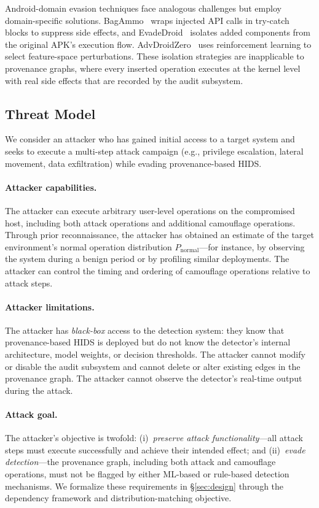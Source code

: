 Android-domain evasion techniques face analogous challenges but employ domain-specific solutions.
BagAmmo~\cite{bagammo} wraps injected API calls in try-catch blocks to suppress side effects, and EvadeDroid~\cite{evadedroid} isolates added components from the original APK's execution flow.
AdvDroidZero~\cite{advdroiedzero} uses reinforcement learning to select feature-space perturbations.
These isolation strategies are inapplicable to provenance graphs, where every inserted operation executes at the kernel level with real side effects that are recorded by the audit subsystem.

\subsection{Threat Model}
\label{sec:bg-threat}

We consider an attacker who has gained initial access to a target system and seeks to execute a multi-step attack campaign (e.g., privilege escalation, lateral movement, data exfiltration) while evading provenance-based HIDS.

\paragraph{Attacker capabilities.}
The attacker can execute arbitrary user-level operations on the compromised host, including both attack operations and additional camouflage operations.
Through prior reconnaissance, the attacker has obtained an estimate of the target environment's normal operation distribution $P_{\text{normal}}$---for instance, by observing the system during a benign period or by profiling similar deployments.
The attacker can control the timing and ordering of camouflage operations relative to attack steps.

\paragraph{Attacker limitations.}
The attacker has \emph{black-box} access to the detection system: they know that provenance-based HIDS is deployed but do not know the detector's internal architecture, model weights, or decision thresholds.
The attacker cannot modify or disable the audit subsystem and cannot delete or alter existing edges in the provenance graph.
The attacker cannot observe the detector's real-time output during the attack.

\paragraph{Attack goal.}
The attacker's objective is twofold: (i)~\emph{preserve attack functionality}---all attack steps must execute successfully and achieve their intended effect; and (ii)~\emph{evade detection}---the provenance graph, including both attack and camouflage operations, must not be flagged by either ML-based or rule-based detection mechanisms.
We formalize these requirements in \S\ref{sec:design} through the dependency framework and distribution-matching objective.
